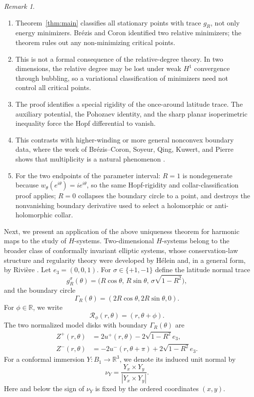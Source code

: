 \documentclass[11pt]{amsart}
\numberwithin{equation}{section}
\theoremstyle{remark}
\newtheorem*{remark}{Remark}
\newcommand{\B}{B_1}
\newcommand{\RR}{\mathbb R}
\newcommand{\eiii}{e_3}
\newcommand{\Rot}{\mathcal R}
\begin{document}
\begin{remark}
\begin{enumerate}
\item[(1)] Theorem~\ref{thm:main} classifies all stationary points with trace \(g_R\), not only energy minimizers. Br\'ezis and Coron
    identified two relative minimizers; the theorem rules out any non-minimizing  critical points.
\item[(2)] This is not a formal consequence of the relative-degree theory. In two dimensions, the relative degree may be lost under weak
    \(H^1\) convergence through bubbling, so a variational classification of minimizers need not control all critical points.
\item[(3)] The proof identifies a special rigidity of the once-around latitude trace. The auxiliary potential, the Pohozaev identity, and
    the sharp planar isoperimetric inequality force the Hopf differential to vanish.
\item[(4)] This contrasts with higher-winding or more general nonconvex boundary data, where the work of Br\'ezis--Coron, Soyeur, Qing,
    Kuwert, and Pierre shows that multiplicity is a natural phenomenon
    \cite{BrCo,Soyeur1989,Qing1992Remark,Qing1992Multiple,Kuwert1994,Pierre2008}.
\item[(5)] For the two endpoints of the parameter interval: $R=1$ is nondegenerate because $w_\theta(e^{i\theta})=ie^{i\theta}$, so the same
    Hopf-rigidity and collar-classification proof applies; $R=0$ collapses the boundary circle to a point, and destroys the nonvanishing
    boundary derivative used to select a holomorphic or anti-holomorphic collar.
\end{enumerate}
\end{remark}

Next, we present an application of the above uniqueness theorem for harmonic maps to the
study of \(H\)-systems. Two-dimensional \(H\)-systems belong to the broader class of
conformally invariant elliptic systems, whose conservation-law structure and regularity theory
were developed by H\'elein and, in a general form, by Rivi\`ere
\cite{Helein,Riviere2007}.
Let $\eiii=(0,0,1)$.
For $\sigma\in\{+1,-1\}$ define the latitude normal trace
\[
g_R^\sigma(\theta)
=
\bigl(R\cos\theta,\,R\sin\theta,\,\sigma\sqrt{1-R^2}\bigr),
\]
and the boundary circle
\[
\Gamma_R(\theta)=(2R\cos\theta,2R\sin\theta,0).
\]
For $\phi\in\RR$, we write
\[
\Rot_\phi(r,\theta)=(r,\theta+\phi) .
\]
The two normalized model disks with boundary $\Gamma_R(\theta)$ are
\begin{align*}
Z^+(r,\theta)
&=2u^+(r,\theta)-2\sqrt{1-R^2}e_3,\\[0.4em]
Z^-(r,\theta)
&=
-2u^-(r,\theta+\pi)+2\sqrt{1-R^2}e_3.
\end{align*}
For a conformal immersion $Y:\B\to\RR^3$, we denote its induced unit normal by
\[
\nu_Y=\frac{Y_x\times Y_y}{|Y_x\times Y_y|}.
\]
Here and below the sign of $\nu_Y$ is fixed by the ordered coordinates $(x,y)$.
\end{document}
